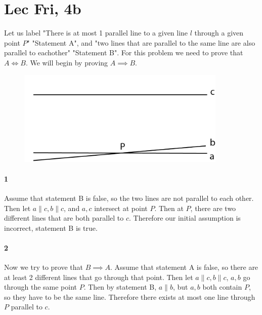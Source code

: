 \documentclass[12pt]{article}
\begin{document}
\section{Lec Fri, 4b}
Let us label "There is at most 1 parallel line to a given line $l$ through a given point $P$" "Statement A", and "two lines that are parallel to  the same line are also parallel to eachother" "Statement B".
\newline
For this problem we need to prove that $A \iff B$. We will begin by proving $A \implies B$.
\newline
\begin{figure}[h]
    \includegraphics[width = 100mm]{GRAPH5.png}
\end{figure}
\paragraph{1}
Assume that statement B is false, so the two lines are not parallel to each other. Then let $a \parallel c, b \parallel c$, and $a, c$ intersect at point $P$. Then at $P$, there are two different lines that are both parallel to $c$. \lightning
\newline
Therefore our initial assumption is incorrect, statement B is true.
\paragraph{2}
Now we try to prove that $B \implies A$. Assume that statement A is false, so there are at least 2 different lines that go through that point. Then let $a \parallel c, b \parallel c$, $a,b$ go through the same point $P$.
Then by statement B, $a \parallel b$, but $a, b$ both contain $P$, so they have to be the same line. \lightning
\newline
Therefore there exists at most one line through $P$ parallel to $c$.
\end{document}
